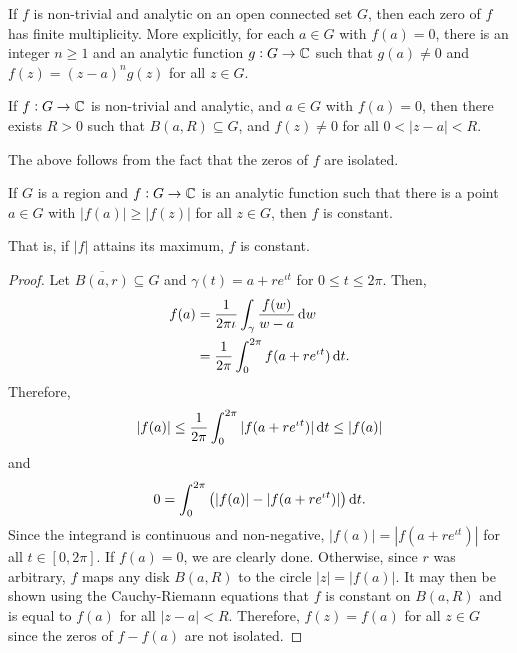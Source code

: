 	\begin{corollary}
		\label{cor: finite multiplicity}
		If $f$ is non-trivial and analytic on an open connected set $G$, then each zero of $f$ has finite multiplicity. More explicitly, for each $a \in G$ with $f(a) = 0$, there is an integer $n \ge 1$ and an analytic function $g : G \to \mathbb{C}$ such that $g(a) \ne 0$ and $f(z) = (z-a)^n g(z)$ for all $z \in G$.
	\end{corollary}

	\begin{corollary}
		If $f : G \to \mathbb{C}$ is non-trivial and analytic, and $a \in G$ with $f(a) = 0$, then there exists $R > 0$ such that $B(a,R) \subseteq G$, and $f(z) \ne 0$ for all $0 < |z-a| < R$. 
	\end{corollary}
	The above follows from the fact that the zeros of $f$ are isolated.

	\begin{ftheo}
		\label{theo: maximum modulus theorem}
		If $G$ is a region and $f:G\to\mathbb{C}$ is an analytic function such that there is a point $a\in G$ with $|f(a)| \ge |f(z)|$ for all $z \in G$, then $f$ is constant.
	\end{ftheo}
	That is, if $|f|$ attains its maximum, $f$ is constant.
	\begin{proof}
		Let $\overline{B(a,r)} \subseteq G$ and $\gamma(t) = a + re^{\iota t}$ for $0 \le t \le 2\pi$. Then,
		\begin{align*}
			f(a) &= \frac{1}{2\pi\iota} \int_\gamma \frac{f(w)}{w-a} \dif w \\
				&= \frac{1}{2\pi} \int_0^{2\pi} f(a + re^{\iota t}) \dif t.
		\end{align*}
		Therefore,
		\[ |f(a)| \le \frac{1}{2\pi} \int_0^{2\pi} |f(a+re^{\iota t})| \dif t \le |f(a)| \]
		and
		\[ 0 = \int_0^{2\pi} \left( |f(a)| - |f(a+re^{\iota t})| \right) \dif t. \]
		Since the integrand is continuous and non-negative, $|f(a)| = |f(a+re^{\iota t})|$ for all $t \in [0,2\pi]$. If $f(a) = 0$, we are clearly done. Otherwise, since $r$ was arbitrary, $f$ maps any disk $B(a,R)$ to the circle $|z| = |f(a)|$. It may then be shown using the Cauchy-Riemann equations that $f$ is constant on $B(a,R)$ and is equal to $f(a)$ for all $|z-a| < R$. Therefore, $f(z) = f(a)$ for all $z \in G$ since the zeros of $f-f(a)$ are not isolated.
	\end{proof}